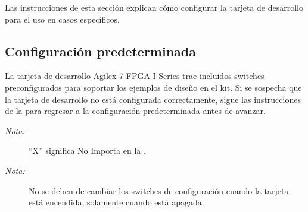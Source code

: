    Las instrucciones de esta secci\'on explican c\'omo configurar la tarjeta de desarrollo para el uso en casos espec\'ificos.

\subsection{Configuraci\'on predeterminada}

    La tarjeta de desarrollo Agilex 7 FPGA I-Series trae incluidos switches preconfigurados para soportar los ejemplos de diseño en el kit. Si se sospecha que la tarjeta de desarrollo no está configurada correctamente, sigue las instrucciones de la  para regresar a la configuraci\'on predeterminada antes de avanzar.

    \begin{description}
        \item[\textit{Nota:}] ``X'' significa No Importa en la . 
        \item[\textit{Nota:}] No se deben de cambiar los switches de configuraci\'on cuando la tarjeta est\'a encendida, solamente cuando est\'a apagada.
    \end{description}

